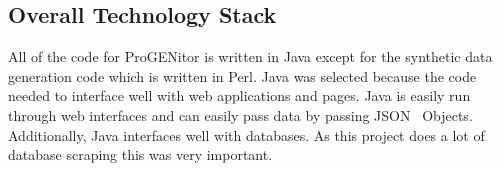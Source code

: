 \subsection{Overall Technology Stack}
All of the code for ProGENitor is written in Java except for the synthetic data
generation code which is written in Perl.  Java was selected because the code
needed to interface well with web applications and pages.  Java is easily run through
web interfaces and can easily pass data by passing JSON~\cite{json} Objects. 
Additionally, Java interfaces well with databases.  As this project does a lot of database
scraping this was very important.
